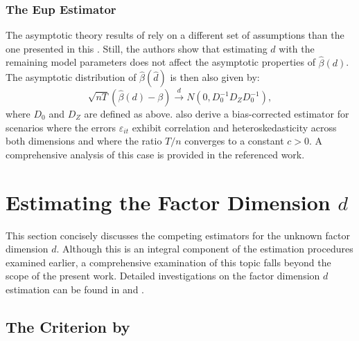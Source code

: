 \subsubsection{The \ac{Eup} Estimator}
The asymptotic theory results of \citet{bada2014parameter} rely on a different set of assumptions than the one presented in this . Still, the authors show that estimating $d$ with the remaining model parameters does not affect the asymptotic properties of $\hat{\beta}(d)$. The asymptotic distribution of $\hat{\beta}(\hat{d})$ is then also given by:
$$
\sqrt{n T}(\hat{\beta}(d)-\beta) \stackrel{d}{\longrightarrow}  N\left(0, D_0^{-1} D_Z D_0^{-1}\right),
$$
where $D_0$ and $D_Z$ are defined as above. \citet{bada2014parameter} also derive a bias-corrected estimator for scenarios where the errors \(\varepsilon_{i t}\) exhibit correlation and heteroskedasticity across both dimensions and where the ratio \(T / n\) converges to a constant \(c > 0\). A comprehensive analysis of this case is provided in the referenced work.
 

\section{Estimating the Factor Dimension $d$}\label{dimension}

This section concisely discusses the competing estimators for the unknown factor dimension $d$. Although this is an integral component of the estimation procedures examined earlier, a comprehensive examination of this topic falls beyond the scope of the present work. Detailed investigations on the factor dimension $d$ estimation can be found in \citet{bai2009panel, kneip2012new} and \citet{bada2012phtt}.  

\subsection{The Criterion by \citet{kneip2012new}}

